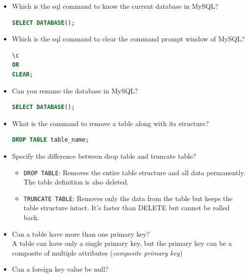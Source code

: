 \documentclass{article}
\begin{document}
\begin{itemize}
    \item Which is the sql command to know the current database in MySQL? \\ 
\begin{lstlisting}[language=SQL]
SELECT DATABASE();
\end{lstlisting}  

    \item Which is the sql command to clear the command prompt window of MySQL? \\
    \begin{lstlisting}[language=SQL]
\c
OR 
CLEAR;
\end{lstlisting}
    \item Can you rename the database in MySQL? \\
    \begin{lstlisting}[language=SQL]
SELECT DATABASE();
\end{lstlisting}

    \item What is the command to remove a table along with its structure? \\
    \begin{lstlisting}[language=SQL]
DROP TABLE table_name;
\end{lstlisting}

    \item Specify the difference between drop table and truncate table? \\
    \begin{itemize}
        \item \texttt{DROP TABLE}: Removes the entire table structure and all data permanently. The table definition is also deleted.
        \item \texttt{TRUNCATE TABLE}: Removes only the data from the table but keeps the table structure intact. It's faster than DELETE but cannot be rolled back.
    \end{itemize}

    \item Can a table have more than one primary key? \\

    A table can have only a single primary key, but the primary key can be a composite of multiple attributes (\textit{composite primary key})
    
    \item Can a foreign key value be null? \\


\end{itemize}
\end{document}
